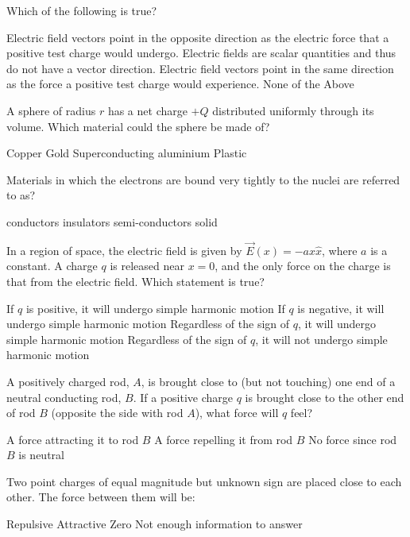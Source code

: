 \question  Which of the following is true?
\begin{checkboxes}
	\choice Electric field vectors point in the opposite direction as the electric force that a positive test charge would undergo.
	\choice Electric fields are scalar quantities and thus do not have a vector direction.
	\CorrectChoice Electric field vectors point in the same direction as the force a positive test charge would experience.
	\choice None of the Above 
\end{checkboxes}

\question A sphere of radius $r$ has a net charge $+Q$ distributed uniformly through its volume. Which material could the sphere be made of?
\begin{checkboxes}
\choice Copper
\choice Gold
\choice Superconducting aluminium
\CorrectChoice Plastic \correct
\end{checkboxes}

\question Materials in which the electrons are bound very tightly to the nuclei are referred to as?
\begin{checkboxes}
\choice conductors
\CorrectChoice insulators \correct
\choice semi-conductors
\choice solid
\end{checkboxes}

\question In a region of space, the electric field is given by $\vec E(x)=-ax\hat x$, where $a$ is a constant. A charge $q$ is released near $x=0$, and the only force on the charge is that from the electric field. Which statement is true?
\begin{checkboxes}
\CorrectChoice If $q$ is positive, it will undergo simple harmonic motion \correct
\choice If $q$ is negative, it will undergo simple harmonic motion
\choice Regardless of the sign of $q$, it will undergo simple harmonic motion
\choice Regardless of the sign of $q$, it will not undergo simple harmonic motion
\end{checkboxes}

\question A positively charged rod, $A$, is brought close to (but not touching) one end of a neutral conducting rod, $B$. If a positive charge $q$ is brought close to the other end of rod $B$ (opposite the side with rod $A$), what force will $q$ feel?
\begin{checkboxes}
\choice A force attracting it to rod $B$
\CorrectChoice A force repelling it from rod $B$ \correct
\choice No force since rod $B$ is neutral
\end{checkboxes}


\question Two point charges of equal magnitude but unknown sign are placed close to each other. The force between them will be:
\begin{checkboxes}
\choice Repulsive
\choice Attractive
\choice Zero
\CorrectChoice Not enough information to answer \correct
\end{checkboxes}

